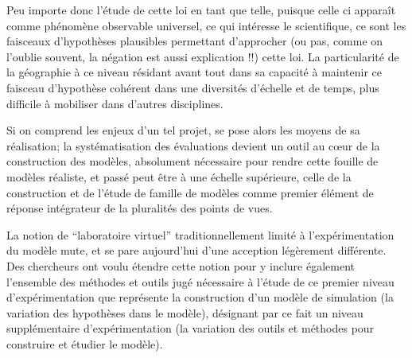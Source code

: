 Peu importe donc l'étude de cette loi en tant que telle, puisque celle ci apparaît comme phénomène observable universel, ce qui intéresse le scientifique, ce sont les faisceaux d'hypothèses plausibles permettant d'approcher (ou pas, comme on l'oublie souvent, la négation est aussi explication !!) cette loi. La particularité de la géographie à ce niveau résidant avant tout dans sa capacité à maintenir ce faisceau d'hypothèse cohérent dans une diversités d'échelle et de temps, plus difficile à mobiliser dans d'autres disciplines.

Si on comprend les enjeux d'un tel projet, se pose alors les moyens de sa réalisation; la systématisation des évaluations devient un outil au cœur de la construction des modèles, absolument nécessaire pour rendre cette fouille de modèles réaliste, et passé peut être à une échelle supérieure, celle de la construction et de l'étude de famille de modèles comme premier élément de réponse intégrateur de la pluralités des points de vues.

La notion de \enquote{laboratoire virtuel} traditionnellement limité à l'expérimentation du modèle mute, et se pare aujourd'hui d'une acception légèrement différente. Des chercheurs \autocite{Schmitt2014} \autocite{Amblard2003} ont voulu étendre cette notion pour y inclure également l'ensemble des méthodes et outils jugé nécessaire à l'étude de ce premier niveau d'expérimentation que représente la construction d'un modèle de simulation (la variation des hypothèses dans le modèle), désignant par ce fait un niveau supplémentaire d’expérimentation (la variation des outils et méthodes pour construire et étudier le modèle).


